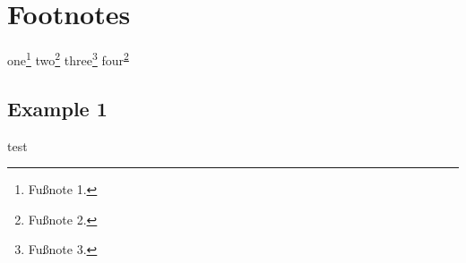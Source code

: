 \chapter{Footnotes}

one\footnote{\label{foot-1} Fußnote 1.}
two\footnote{\label{foot-2} Fußnote 2.}
three\footnote{\label{foot-3} Fußnote 3.}
four\textsuperscript{\ref{foot-2}}

\section{Example 1}
test